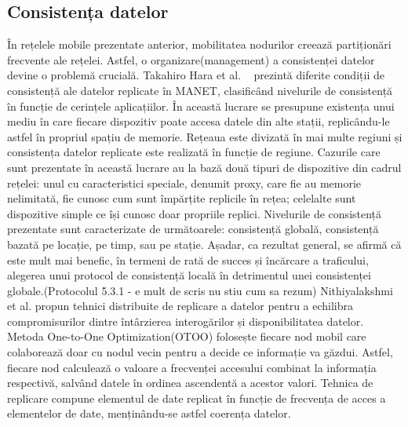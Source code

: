 \documentclass[12pt,a4paper]{report}
\begin{document}
\subsection{Consistența datelor}
În rețelele mobile prezentate anterior, mobilitatea nodurilor creează partiționări frecvente ale rețelei. Astfel, o organizare(management) a consistenței datelor devine o problemă crucială. Takahiro Hara et al. ~\cite{hara2009consistency} prezintă diferite condiții de consistență ale datelor replicate în MANET, clasificând nivelurile de consistență în funcție de cerințele aplicațiilor. În această lucrare se presupune existența unui mediu în care fiecare dispozitiv poate accesa datele din alte stații, replicându-le astfel în propriul spațiu de memorie. Rețeaua este divizată în mai multe regiuni și consistența datelor replicate este realizată în funcție de regiune. Cazurile care sunt prezentate în această lucrare au la bază două tipuri de dispozitive din cadrul rețelei: unul cu caracteristici speciale, denumit proxy, care fie au memorie nelimitată, fie cunosc cum sunt împărțite replicile în rețea; celelalte sunt dispozitive simple ce își cunosc doar propriile replici. Nivelurile de consistență prezentate sunt caracterizate de următoarele: consistență globală, consistență bazată pe locație, pe timp, sau pe stație. Așadar, ca rezultat general, se afirmă că este mult mai benefic, în termeni de rată de succes și încărcare a traficului, alegerea unui protocol de consistență locală în detrimentul unei consistenței globale.(Protocolul 5.3.1 - e mult de scris nu stiu cum sa rezum)
Nithiyalakshmi et al.\cite{nithiyalakshmi2014data} propun tehnici distribuite de replicare a datelor pentru a echilibra compromisurilor dintre întârzierea interogărilor și disponibilitatea datelor. Metoda One-to-One Optimization(OTOO) folosește fiecare nod mobil care colaborează doar cu nodul vecin pentru a decide ce informație va găzdui. Astfel, fiecare nod calculează o valoare a frecvenței accesului combinat la informația respectivă, salvând datele în ordinea ascendentă a acestor valori. Tehnica de replicare compune elementul de date replicat în funcție de frecvența de acces a elementelor de date, menținându-se astfel coerența datelor.
\end{document}
